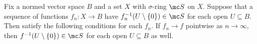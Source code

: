 \documentclass[../notes.tex]{subfiles}
\begin{document}
\begin{lemma} \label{lem:limit-measurable-pre-image}
	Fix a normed vector space $B$ and a set $X$ with $\sigma$-ring $\mc S$ on $X$. Suppose that a sequence of functions $f_n\colon X\to B$ have $f_n^{-1}(U\setminus\{0\})\in\mc S$ for each open $U\subseteq B$. Then satisfy the following conditions for each $f_n$. If $f_n\to f$ pointwise as $n\to\infty$, then $f^{-1}(U\setminus\{0\})\in\mc S$ for each open $U\subseteq B$ as well.
\end{lemma}
\end{document}
